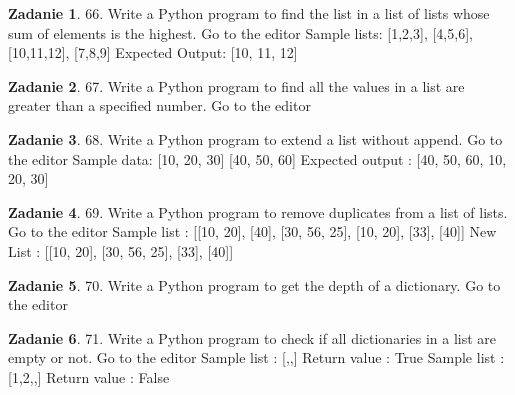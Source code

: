 \documentclass[11pt]{article}
\theoremstyle{definition}
\newtheorem{zadanie}{Zadanie}
\begin{document}
\begin{zadanie}


66. Write a Python program to find the list in a list of lists whose sum of elements is the highest. Go to the editor
Sample lists: [1,2,3], [4,5,6], [10,11,12], [7,8,9]
Expected Output: [10, 11, 12]


\end{zadanie}

\begin{zadanie}


67. Write a Python program to find all the values in a list are greater than a specified number. Go to the editor


\end{zadanie}

\begin{zadanie}


68. Write a Python program to extend a list without append. Go to the editor
Sample data: [10, 20, 30]
[40, 50, 60]
Expected output : [40, 50, 60, 10, 20, 30]


\end{zadanie}

\begin{zadanie}


69. Write a Python program to remove duplicates from a list of lists. Go to the editor
Sample list : [[10, 20], [40], [30, 56, 25], [10, 20], [33], [40]]
New List : [[10, 20], [30, 56, 25], [33], [40]]


\end{zadanie}

\begin{zadanie}


70. Write a Python program to get the depth of a dictionary. Go to the editor


\end{zadanie}

\begin{zadanie}


71. Write a Python program to check if all dictionaries in a list are empty or not. Go to the editor
Sample list : [{},{},{}]
Return value : True
Sample list : [{1,2},{},{}]
Return value : False


\end{zadanie}
\end{document}
